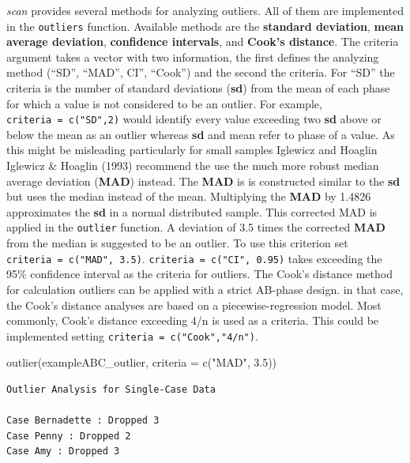 \documentclass[
  letterpaper,
  DIV=11,
  numbers=noendperiod]{scrreprt}
\newenvironment{Shaded}{\begin{snugshade}}{\end{snugshade}}
\newcommand{\AttributeTok}[1]{\textcolor[rgb]{0.40,0.45,0.13}{#1}}
\newcommand{\FloatTok}[1]{\textcolor[rgb]{0.68,0.00,0.00}{#1}}
\newcommand{\FunctionTok}[1]{\textcolor[rgb]{0.28,0.35,0.67}{#1}}
\newcommand{\NormalTok}[1]{\textcolor[rgb]{0.00,0.23,0.31}{#1}}
\newcommand{\StringTok}[1]{\textcolor[rgb]{0.13,0.47,0.30}{#1}}
\begin{document}
\emph{scan} provides several methods for analyzing outliers. All of them
are implemented in the \texttt{outliers} function. Available methods are
the \textbf{standard deviation}, \textbf{mean average deviation},
\textbf{confidence intervals}, and \textbf{Cook's distance}. The
criteria argument takes a vector with two information, the first defines
the analyzing method (``SD'', ``MAD'', CI'', ``Cook'') and the second
the criteria. For ``SD'' the criteria is the number of standard
deviations (\textbf{sd}) from the mean of each phase for which a value
is not considered to be an outlier. For example,
\texttt{criteria\ =\ c("SD",2)} would identify every value exceeding two
\textbf{sd} above or below the mean as an outlier whereas \textbf{sd}
and mean refer to phase of a value. As this might be misleading
particularly for small samples Iglewicz and Hoaglin Iglewicz \& Hoaglin
(1993) recommend the use the much more robust median average deviation
(\textbf{MAD}) instead. The \textbf{MAD} is is constructed similar to
the \textbf{sd} but uses the median instead of the mean. Multiplying the
\textbf{MAD} by 1.4826 approximates the \textbf{sd} in a normal
distributed sample. This corrected MAD is applied in the
\texttt{outlier} function. A deviation of 3.5 times the corrected
\textbf{MAD} from the median is suggested to be an outlier. To use this
criterion set \texttt{criteria\ =\ c("MAD",\ 3.5)}.
\texttt{criteria\ =\ c("CI",\ 0.95)} takes exceeding the 95\% confidence
interval as the criteria for outliers. The Cook's distance method for
calculation outliers can be applied with a strict AB-phase design. in
that case, the Cook's distance analyses are based on a
piecewise-regression model. Most commonly, Cook's distance exceeding 4/n
is used as a criteria. This could be implemented setting
\texttt{criteria\ =\ c("Cook","4/n")}.

\begin{Shaded}
\begin{Highlighting}[]
\FunctionTok{outlier}\NormalTok{(exampleABC\_outlier, }\AttributeTok{criteria =} \FunctionTok{c}\NormalTok{(}\StringTok{"MAD"}\NormalTok{, }\FloatTok{3.5}\NormalTok{))}
\end{Highlighting}
\end{Shaded}

\begin{verbatim}
Outlier Analysis for Single-Case Data

Case Bernadette : Dropped 3 
Case Penny : Dropped 2 
Case Amy : Dropped 3 
\end{verbatim}
\end{document}
